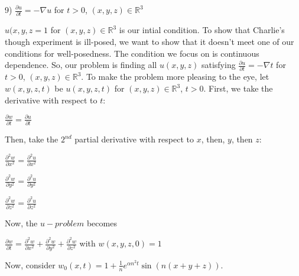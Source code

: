 \documentclass[executivepaper]{article}
\begin{document}
\begin{flushleft}

9) $\frac{\partial u}{\partial t}=-\nabla u$ for $t > 0$, $(x,y,z) \in \mathbb{R}^3$

\vspace{2mm}

$u(x,y,z=1$ for $(x,y,z) \in \mathbb{R}^3$ is our intial condition. To show that Charlie's though experiment is ill-posed, we want to show that it doesn't meet one of our conditions for well-posedness. The condition we focus on is continuous dependence. So, our problem is finding all $u(x,y,z)$ satisfying $\frac{\partial u}{\partial t}=-\nabla t$ for $t > 0$, $(x,y,z) \in \mathbb{R}^3$. To make the problem more pleasing to the eye, let $w(x,y,z,t)$ be $u(x,y,z,t)$ for $(x,y,z) \in \mathbb{R}^3$, $t > 0$. First, we take the derivative with respect to $t$:

\begin{center}

$\frac{\partial w}{\partial t}=\frac{\partial u}{\partial t}$

\end{center}

Then, take the $2^{nd}$ partial derivative with respect to $x$, then, $y$, then $z$:

\begin{center}

$\frac{\partial^2 w}{\partial x^2}=\frac{\partial^2 u}{\partial x^2}$

\vspace{2mm}

$\frac{\partial^2 w}{\partial y^2}=\frac{\partial^2 u}{\partial y^2}$

\vspace{2mm}

$\frac{\partial^2 w}{\partial z^2}=\frac{\partial^2 u}{\partial z^2}$

\end{center}

Now, the $u-problem$ becomes

\begin{center}

$\frac{\partial w}{\partial t}=\frac{\partial^2 w}{\partial x^2}+\frac{\partial^2 w}{\partial y^2} + \frac{\partial^2 w}{\partial z^2}$ with $w(x,y,z,0)=1$

\end{center}

Now, consider $w_{0}(x,t)=1+\frac{1}{n} e^{\alpha n^{2}t} \sin(n(x+y+z))$.


\end{flushleft}
\end{document}
